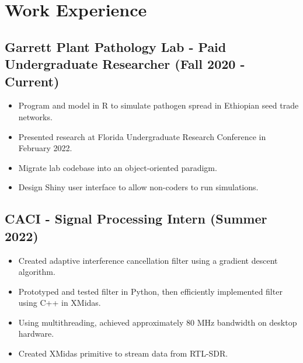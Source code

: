 \documentclass{article}
\newcommand{\sectionspacing}{\vspace{-.4em}} %
\newenvironment{CustomItemize}
{ \begin{itemize}[leftmargin=1em]
    \setlength{\itemsep}{0pt}
    \setlength{\parskip}{0pt}
    \setlength{\parindent}{0pt}
    \setlength{\parsep}{0pt}     }
{ \end{itemize}                  }
\begin{document}

\sectionspacing{}

\section{Work Experience}

\subsection{Garrett Plant Pathology Lab - Paid Undergraduate Researcher (Fall 2020 - Current)}
\begin{CustomItemize}
\item Program and model in R to simulate pathogen spread in Ethiopian seed trade networks.
\item Presented research at Florida Undergraduate Research Conference in February 2022.
\item Migrate lab codebase into an object-oriented paradigm.
\item Design Shiny user interface to allow non-coders to run simulations.
\end{CustomItemize}

\subsection{CACI - Signal Processing Intern (Summer 2022)}
\begin{CustomItemize}
\item Created adaptive interference cancellation filter using a gradient descent algorithm.
\item Prototyped and tested filter in Python, then efficiently implemented filter using C++ in XMidas.
\item Using multithreading, achieved approximately 80 MHz bandwidth on desktop hardware.
\item Created XMidas primitive to stream data from RTL-SDR.
\end{CustomItemize}
\end{document}
